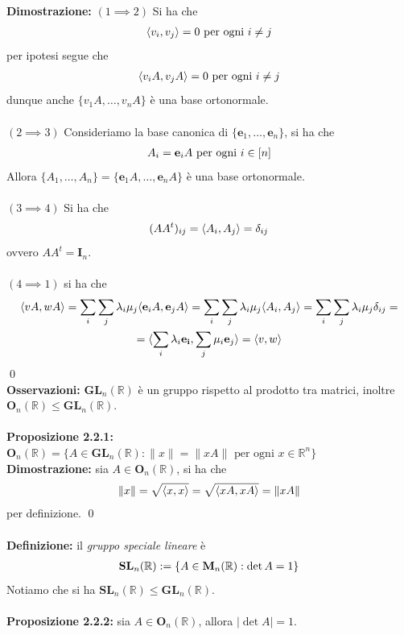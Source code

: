 \documentclass{article}
\begin{document}
\textbf{Dimostrazione:} $(1 \implies 2)$ Si ha che
\begin{gather}
    \langle v_i, v_j \rangle = 0 \text{ per ogni } i \neq j \notag
\end{gather}
per ipotesi segue che
\begin{gather}
    \langle v_iA, v_jA \rangle = 0 \text{ per ogni } i \neq j \notag
\end{gather}
dunque anche $\{ v_1A, \dots, v_nA \}$ è una base ortonormale. \\ \\
$(2 \implies 3)$ Consideriamo la base canonica di $\{ \mathbf{e}_1, \dots, \mathbf{e}_n \}$, si ha che
\begin{gather}
    A_i = \mathbf{e}_iA \text{ per ogni } i \in [n] \notag
\end{gather}
Allora $\{ A_1, \dots, A_n \} = \{ \mathbf{e}_1A, \dots, \mathbf{e}_nA \}$ è una base ortonormale. \\ \\
$(3 \implies 4)$ Si ha che
\begin{gather}
    (AA^t)_{ij} = \langle A_i, A_j \rangle  = \delta_{ij} \notag
\end{gather}
ovvero $AA^t = \mathbf{I}_n$. \\ \\
$(4 \implies 1)$ si ha che
\begin{gather}
    \langle vA, wA \rangle = \sum_i \sum_j \lambda_i\mu_j \langle \mathbf{e}_iA, \mathbf{e}_jA \rangle = \sum_i \sum_j \lambda_i\mu_j \langle A_i, A_j \rangle = \sum_i\sum_j \lambda_i\mu_j \delta_{ij} = \notag \\
    = \langle \sum_i \lambda_i\mathbf{e_i}, \sum_j \mu_i\mathbf{e}_j \rangle = \langle v, w \rangle \notag
\end{gather} \qed \\
\textbf{Osservazioni:} $\mathbf{GL}_n(\mathbb{R})$ è un gruppo rispetto al prodotto tra matrici, inoltre $\mathbf{O}_n(\mathbb{R}) \leq \mathbf{GL}_n(\mathbb{R})$. \\ \\
\textbf{Proposizione 2.2.1:} $\mathbf{O}_n(\mathbb{R}) = \{ A \in \mathbf{GL}_n(\mathbb{R}) : \| x \| = \| xA \| \text{ per ogni } x \in \mathbb{R}^n \}$ \\

\textbf{Dimostrazione:} sia $A \in \mathbf{O}_n(\mathbb{R})$, si ha che
\begin{gather}
    \| x \| = \sqrt{\langle x, x \rangle} = \sqrt{\langle xA, xA \rangle} = \| xA \| \notag
\end{gather}
per definizione. \qed \\ \\
\textbf{Definizione:} il \textit{gruppo speciale lineare} è
\begin{gather}
    \mathbf{SL}_n(\mathbb{R}) := \{ A \in \mathbf{M}_n(\mathbb{R}) : \det A = 1 \} \notag
\end{gather}
Notiamo che si ha $\mathbf{SL}_n(\mathbb{R}) \leq \mathbf{GL}_n(\mathbb{R})$. \\ \\
\textbf{Proposizione 2.2.2:} sia $A \in \mathbf{O}_n(\mathbb{R})$, allora $|\det A| = 1$. \\
\end{document}

